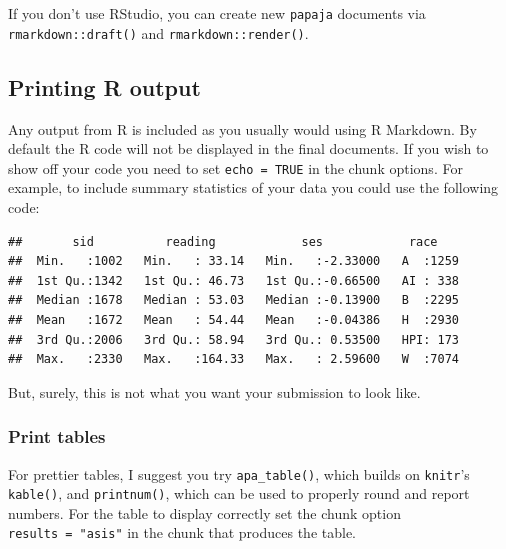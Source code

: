 \documentclass[
  english,
  man]{apa6}
\begin{document}
If you don't use RStudio, you can create new \texttt{papaja} documents via \texttt{rmarkdown::draft()} and \texttt{rmarkdown::render()}.

\hypertarget{printing-r-output}{%
\subsection{Printing R output}\label{printing-r-output}}

Any output from R is included as you usually would using R Markdown.
By default the R code will not be displayed in the final documents.
If you wish to show off your code you need to set \texttt{echo\ =\ TRUE} in the chunk options.
For example, to include summary statistics of your data you could use the following code:

\begin{verbatim}
##       sid          reading            ses            race     
##  Min.   :1002   Min.   : 33.14   Min.   :-2.33000   A  :1259  
##  1st Qu.:1342   1st Qu.: 46.73   1st Qu.:-0.66500   AI : 338  
##  Median :1678   Median : 53.03   Median :-0.13900   B  :2295  
##  Mean   :1672   Mean   : 54.44   Mean   :-0.04386   H  :2930  
##  3rd Qu.:2006   3rd Qu.: 58.94   3rd Qu.: 0.53500   HPI: 173  
##  Max.   :2330   Max.   :164.33   Max.   : 2.59600   W  :7074
\end{verbatim}

But, surely, this is not what you want your submission to look like.

\hypertarget{print-tables}{%
\subsubsection{Print tables}\label{print-tables}}

For prettier tables, I suggest you try \texttt{apa\_table()}, which builds on \texttt{knitr}'s \texttt{kable()}, and \texttt{printnum()}, which can be used to properly round and report numbers.
For the table to display correctly set the chunk option \texttt{results\ =\ "asis"} in the chunk that produces the table.
\end{document}
